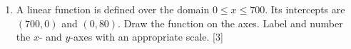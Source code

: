 \documentclass[12pt, twoside]{article}
\begin{document}
\begin{enumerate}
\newpage
\item A linear function is defined over the domain $0 \leq x \leq 700$. Its intercepts are $(700,0)$ and $(0, 80)$. Draw the function on the axes. Label and number the $x$- and $y$-axes with an appropriate scale. \hfill [3]
  \begin{center}
  \end{center}
  
\end{enumerate}
\end{document}
